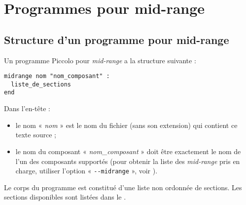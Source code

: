 
\cleardoublepage

\chapter{Programmes pour mid-range}

\thispagestyle{empty}




\section{Structure d’un programme pour mid-range}

Un programme Piccolo pour \emph{mid-range} a la structure suivante :

\begin{lstlisting}[language=piccolo]
midrange nom "nom_composant" :
  liste_de_sections
end
\end{lstlisting}


Dans l’en-tête :
\begin{itemize}
  \item le nom « \emph{nom} » est le nom du fichier (sans son extension) qui contient ce texte source ;
  \item le nom du composant « \emph{nom\_composant} » doit être exactement le nom de l’un des composants supportés (pour obtenir la liste des \emph{mid-range} pris en charge, utiliser l’option « \texttt{-{}-midrange} », voir ).
\end{itemize}


Le corps du programme est constitué d’une liste non ordonnée de sections. Les sections disponibles sont listées dans le .

